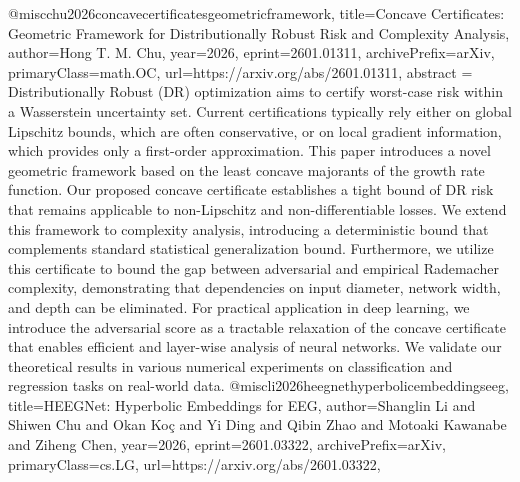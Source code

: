 {}@misc{chu2026concavecertificatesgeometricframework,
      title={Concave Certificates: Geometric Framework for Distributionally Robust Risk and Complexity Analysis}, 
      author={Hong T. M. Chu},
      year={2026},
      eprint={2601.01311},
      archivePrefix={arXiv},
      primaryClass={math.OC},
      url={https://arxiv.org/abs/2601.01311},
      abstract = {Distributionally Robust (DR) optimization aims to certify worst-case risk within a Wasserstein uncertainty set. Current certifications typically rely either on global Lipschitz bounds, which are often conservative, or on local gradient information, which provides only a first-order approximation. This paper introduces a novel geometric framework based on the least concave majorants of the growth rate function. Our proposed concave certificate establishes a tight bound of DR risk that remains applicable to non-Lipschitz and non-differentiable losses. We extend this framework to complexity analysis, introducing a deterministic bound that complements standard statistical generalization bound. Furthermore, we utilize this certificate to bound the gap between adversarial and empirical Rademacher complexity, demonstrating that dependencies on input diameter, network width, and depth can be eliminated. For practical application in deep learning, we introduce the adversarial score as a tractable relaxation of the concave certificate that enables efficient and layer-wise analysis of neural networks. We validate our theoretical results in various numerical experiments on classification and regression tasks on real-world data.}
}@misc{li2026heegnethyperbolicembeddingseeg,
      title={HEEGNet: Hyperbolic Embeddings for EEG}, 
      author={Shanglin Li and Shiwen Chu and Okan Koç and Yi Ding and Qibin Zhao and Motoaki Kawanabe and Ziheng Chen},
      year={2026},
      eprint={2601.03322},
      archivePrefix={arXiv},
      primaryClass={cs.LG},
      url={https://arxiv.org/abs/2601.03322},
}
